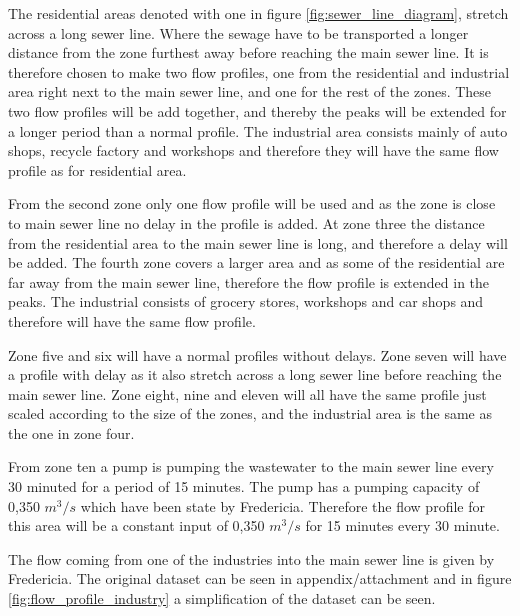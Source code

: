 The residential areas denoted with one in figure \ref{fig:sewer_line_diagram}, stretch across a long sewer line. Where the sewage have to be transported a longer distance from the zone furthest away before reaching the main sewer line. It is therefore chosen to make two flow profiles, one from the residential and industrial area right next to the main sewer line, and one for the rest of the zones. These two flow profiles will be add together, and thereby the peaks will be extended for a longer period than a normal profile. The industrial area consists mainly of auto shops, recycle factory and workshops and therefore they will have the same flow profile as for residential area. 

From the second zone only one flow profile will be used and as the zone is close to main sewer line no delay in the profile is added. At zone three the distance from the residential area to the main sewer line is long, and therefore a delay will be added. The fourth zone covers a larger area and as some of the residential are far away from the main sewer line, therefore the flow profile is extended in the peaks. The industrial consists of grocery stores, workshops and car shops and therefore will have the same flow profile.

Zone five and six will have a normal profiles without delays. Zone seven will have a profile with delay as it also stretch across a long sewer line before reaching the main sewer line. Zone eight, nine and eleven will all have the same profile just scaled according to the size of the zones, and the industrial area is the same as the one in zone four. 

From zone ten a pump is pumping the wastewater to the main sewer line every 30 minuted for a period of 15 minutes. The pump has a pumping capacity of 0,350 $m^3/s$ which have been state by Fredericia. Therefore the flow profile for this area will be a constant input of 0,350 $m^3/s$ for 15 minutes every 30 minute. 

The flow coming from one of the industries into the main sewer line is given by Fredericia. The original dataset can be seen in appendix/attachment and in figure \ref{fig:flow_profile_industry} a simplification of the dataset can be seen.


